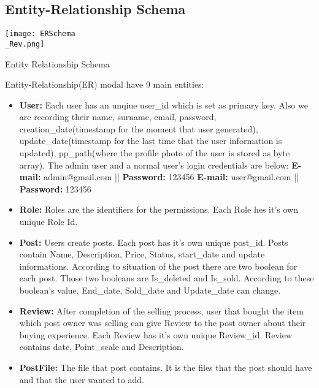 
\subsection{Entity-Relationship Schema}



    
\texttt{[image: ERSchema\\\_Rev.png]}
\begin{center}
\caption{Entity Relationship Schema}
\label{fig:my\_label}
\end{center}
\clearpage

\newline Entity-Relationship(ER) modal have 9 main entities:
\begin{itemize}
    \item \textbf{User:} Each user has an unqiue user\_id which is set as primary key. Also we are recording their name, surname, email, password, creation\_date(timestamp for the moment that user generated), update\_date(timestamp for the last time that the user information is updated), pp\_path(where the profile photo of the user is stored as byte array). The admin user and a normal user's login credentials are below: \newline
    \textbf{E-mail:} admin@gmail.com ||
    \textbf{Password:} 123456\newline
    \textbf{E-mail:} user@gmail.com ||
    \textbf{Password:} 123456
    \item \textbf{Role:} Roles are the identifiers for the permissions. Each Role hes it's own unique Role Id.\newline
    \item \textbf{Post:} Users create posts. Each post has it's own unique post\_id. Posts contain Name, Description, Price, Status, start\_date and update informations. According to situation of the post there are two boolean for each post. Those two booleans are Is\_deleted and Is\_sold. According to these boolean's value, End\_date, Sold\_date and Update\_date can change.\newline
    \item \textbf{Review:} After completion of the selling process, user that bought the item which post owner was selling can give Review to the post owner about their buying experience. Each Review has it's own unique Review\_id. Review contains date, Point\_scale and Description. \newline
    \item \textbf{PostFile: }The file that post contains. It is the files that the post should have and that the user wanted to add.\newline

\end{itemize}
